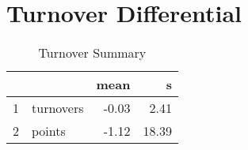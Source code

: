 \documentclass{exam}
\begin{document}

  \section{Turnover Differential}

  \begin{table}[H]
    \centering
    \begin{tabular}{rlrr}
      \toprule
        &           & mean  & s \\
      \midrule
      1 & turnovers & -0.03 & 2.41 \\
      2 & points    & -1.12 & 18.39 \\
      \bottomrule
    \end{tabular}
    \caption{Turnover Summary}
  \end{table}
\end{document}
